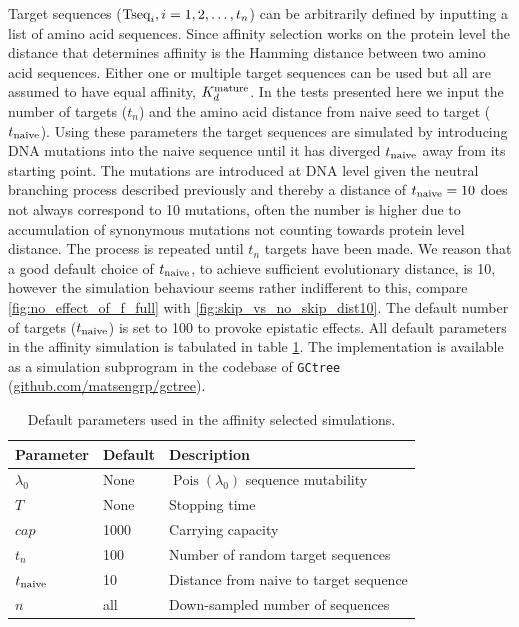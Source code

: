 Target sequences ($\text{Tseq}_i, i=1,2, \hdots, t_n$) can be arbitrarily defined by inputting a list of amino acid sequences.
Since affinity selection works on the protein level the distance that determines affinity is the Hamming distance between two amino acid sequences.
Either one or multiple target sequences can be used but all are assumed to have equal affinity, $K^{\text{mature}}_d$.
In the tests presented here we input the number of targets ($t_n$) and the amino acid distance from naive seed to target ($t_{\text{naive}}$).
Using these parameters the target sequences are simulated by introducing DNA mutations into the naive sequence until it has diverged $t_{\text{naive}}$ away from its starting point.
The mutations are introduced at DNA level given the neutral branching process described previously and thereby a distance of $t_{\text{naive}}=10$ does not always correspond to 10 mutations, often the number is higher due to accumulation of synonymous mutations not counting towards protein level distance.
The process is repeated until $t_n$ targets have been made.
We reason that a good default choice of $t_{\text{naive}}$, to achieve sufficient evolutionary distance, is 10, however the simulation behaviour seems rather indifferent to this, compare \ref{fig:no_effect_of_f_full} with \ref{fig:skip_vs_no_skip_dist10}.
The default number of targets ($t_{\text{naive}}$) is set to 100 to provoke epistatic effects.
All default parameters in the affinity simulation is tabulated in table \ref{aff_constants}.
The implementation is available as a simulation subprogram in the codebase of \texttt{GCtree} (\url{github.com/matsengrp/gctree}).

\begin{table}[ht]
\centering
\begin{tabular}{lll}
Parameter    & Default & Description \\ \hline
$\lambda_0$ & None & $\operatorname{Pois}(\lambda_0)$ sequence mutability \\
$T$ & None & Stopping time \\
$cap$ & 1000 & Carrying capacity \\
$t_n$ & 100 & Number of random target sequences \\
$t_{\text{naive}}$ & 10 & Distance from naive to target sequence \\
$n$ & all & Down-sampled number of sequences
\end{tabular}
\caption{
\label{aff_constants}
    Default parameters used in the affinity selected simulations.}
\end{table}










